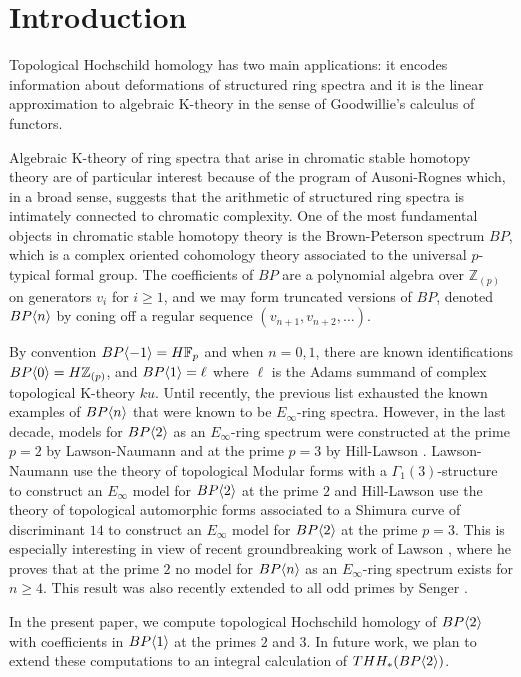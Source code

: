 
\section{Introduction}
Topological Hochschild homology has two main applications: it encodes information about deformations of structured ring spectra and it is the linear approximation to algebraic K-theory in the sense of Goodwillie's calculus of functors. 

Algebraic K-theory of ring spectra that arise in chromatic stable homotopy theory are of particular interest because of the program of Ausoni-Rognes \cite{AR02} which, in a broad sense, suggests that the arithmetic of structured ring spectra  is intimately connected to chromatic complexity. One of the most fundamental objects in chromatic stable homotopy theory is the Brown-Peterson spectrum $BP$, which is a complex oriented cohomology theory associated to the universal $p$-typical formal group. The coefficients of $BP$ are a polynomial algebra over $\mathbb{Z}_{(p)}$ on generators $v_i$ for $i\ge 1$, and we may form truncated versions of $BP$, denoted $BP\langle n \rangle$ by coning off a regular sequence $(v_{n+1},v_{n+2}, \ldots )$. 

By convention $BP\langle -1 \rangle=H\mathbb{F}_p$ and when $n=0,1$, there are known identifications $BP\langle 0 \rangle=H\mathbb{Z}_{(p)}$, and $BP\langle 1 \rangle=\ell$ where $\ell$ is the Adams summand of complex topological K-theory $ku$. Until recently, the previous list exhausted the known examples of $BP\langle n \rangle$ that were known to be $E_{\infty}$-ring spectra. However, in the last decade, models for $BP\langle 2 \rangle$ as an $E_{\infty}$-ring spectrum were constructed at the prime $p=2$ by Lawson-Naumann \cite{LawsonNaumann} and at the prime $p=3$ by Hill-Lawson \cite{HillLawson}. Lawson-Naumann \cite{LawsonNaumann} use the theory of topological Modular forms with a $\Gamma_1(3)$-structure to construct an $E_{\infty}$ model for $BP\langle 2 \rangle$ at the prime $2$ and Hill-Lawson \cite{HillLawson} use the theory of topological automorphic forms associated to a Shimura curve of discriminant $14$ to construct an $E_{\infty}$ model for $BP\langle 2 \rangle$ at the prime $p=3$. This is especially interesting in view of recent groundbreaking work of Lawson \cite{Law18}, where he proves that at the prime $2$ no model for $BP\langle n \rangle$ as an $E_{\infty}$-ring spectrum exists for $n\ge 4$. This result was also recently extended to all odd primes by Senger \cite{Sen17}. 

In the present paper, we compute topological Hochschild homology of $BP\langle 2 \rangle$ with coefficients in $BP\langle 1 \rangle$ at the primes $2$ and $3$. %
In future work, we plan to extend these computations to an integral calculation of $THH_*(BP\langle 2 \rangle)$. 

